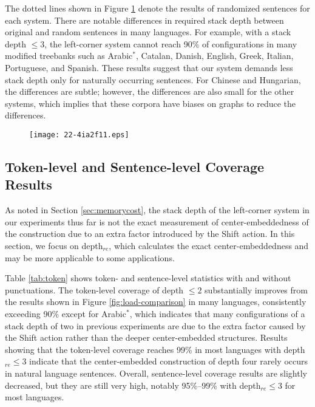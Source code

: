 \documentclass[english]{jnlp_1.4}
\begin{document}
The dotted lines shown in Figure \ref{fig:load-comparison-random} denote the results of randomized sentences for each system.
There are notable differences in required stack depth between original and random sentences in many languages.
For example, with a stack depth $\leq 3$, the left-corner system cannot reach 90\% of configurations in many modified treebanks such as Arabic$^*$, Catalan, Danish, English, Greek, Italian, Portuguese, and Spanish.
These results suggest that our system demands less stack depth only for naturally occurring sentences.
For Chinese and Hungarian, the differences are subtle;
however, the differences are also small for the other systems, which implies that these corpora have biases on graphs to reduce the differences.

\begin{figure}[p]
\begin{center}
\texttt{[image: 22-4ia2f11.eps]}
\end{center}
\label{fig:load-comparison-random}
\end{figure}


\subsection{Token-level and Sentence-level Coverage Results}
\label{sec:token}

As noted in Section \ref{sec:memorycost}, the stack depth of the left-corner system in our experiments thus far is not the exact measurement of center-embeddedness of the construction due to an extra factor introduced by the {\sc Shift} action.
In this section, we focus on depth$_{re}$, which calculates the exact center-embeddedness and may be more applicable to some applications.

Table \ref{tab:token} shows token- and sentence-level statistics with and without punctuations.
The token-level coverage of depth $\leq 2$ substantially improves from the results shown in Figure \ref{fig:load-comparison} in many languages, consistently exceeding 90\% except for Arabic$^*$, which indicates that many configurations of a stack depth of two in previous experiments are due to the extra factor caused by the {\sc Shift} action rather than the deeper center-embedded structures.
Results showing that the token-level coverage reaches 99\% in most languages with depth$_{re} \leq 3$ indicate that the center-embedded construction of depth four rarely occurs in natural language sentences.
Overall, sentence-level coverage results are slightly decreased, but they are still very high, notably 95\%--99\% with depth$_{re} \leq 3$ for most languages.
\end{document}
